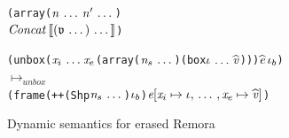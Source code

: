 {\begin{figure}
{\begin{alltt}
        (array ($\sequence{\nat}\sequence{\nat'}$)
        $\mathit{Concat}\llb
        \sequence{\parens{\sequence{\atval}}}\rrb$)
      \end{alltt}} \smallskip
    {\begin{alltt}
        (unbox ($\sequence{\var_i}$ $\var_e$ (array ($\sequence{\nat_s}$) (box $\sequence{\idx}$ $\evalue$))) $\eexpr$ $\idx_b$)
        \\$\mapsto_{\mathit{unbox}}$
        (frame (++ (Shp $\sequence{\nat_s}$) $\idx_b$) $\multisubst
        {\expr}
        {\sequence{\singlesubst{\var_i}{\idx},},
          \singlesubst{\var_e}{\evalue}}$)
      \end{alltt}}
     \caption{Dynamic semantics for erased Remora}
    \label{fig:ErasedSemantics}
 \end{figure}
}

